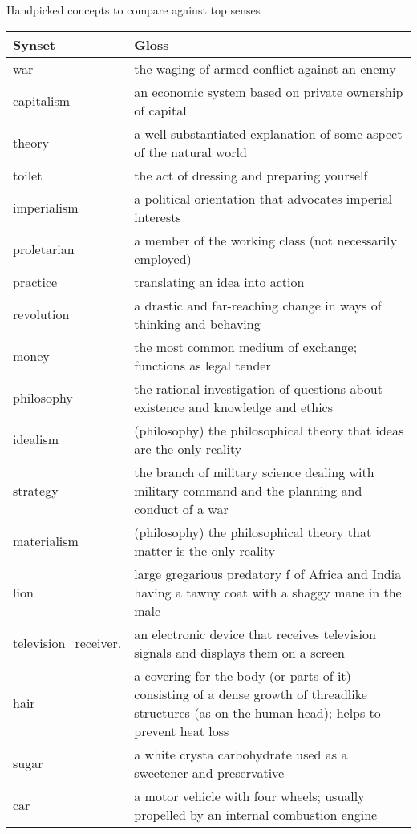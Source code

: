 Handpicked concepts to compare against top senses\\

\begin{table*}[ht]
\centering
\begin{tabular}{ p{2.5cm} p{15cm} }
    \toprule
    Synset & Gloss \\
    \midrule
            war & the waging of armed conflict against an enemy \\
            capitalism & an economic system based on private ownership of capital\\
            theory & a well-substantiated explanation of some aspect of the natural world \\
            toilet & the act of dressing and preparing yourself \\
            imperialism & a political orientation that advocates imperial interests \\
            proletarian & a member of the working class (not necessarily employed) \\
            practice & translating an idea into action \\
            revolution & a drastic and far-reaching change in ways of thinking and behaving \\
            money & the most common medium of exchange; functions as legal tender \\
            philosophy & the rational investigation of questions about existence and knowledge and ethics \\
            idealism & (philosophy) the philosophical theory that ideas are the only reality \\
            strategy & the branch of military science dealing with military command and the planning and conduct of a war \\
            materialism & (philosophy) the philosophical theory that matter is the only reality \\
            lion & large gregarious predatory f of Africa and India having a tawny coat with a shaggy mane in the male \\
            television\_receiver. & an electronic device that receives television signals and displays them on a screen \\
            hair & a covering for the body (or parts of it) consisting of a dense growth of threadlike structures (as on the human head); helps to prevent heat loss \\
            sugar & a white crysta carbohydrate used as a sweetener and preservative \\
            car & a motor vehicle with four wheels; usually propelled by an internal combustion engine \\

    \bottomrule
\end{tabular}

\end{table*}

